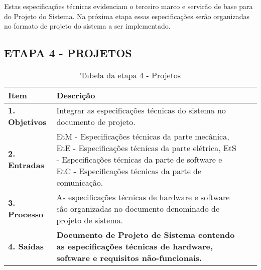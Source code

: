  Estas especificações técnicas evidenciam o terceiro marco e servirão de base para do Projeto do Sistema. Na próxima etapa essas especificações serão organizadas no formato de projeto do sistema a ser implementado. 
 
 
  
 \newpage
\subsection{ETAPA 4 - PROJETOS}

\begin{description}

\begin{table}[htbp]
	\centering
	\caption{Tabela da etapa 4 - Projetos}
	\begin{tabular}{|l| p{13.5cm}| c| c| } \hline
		\textbf{Item} 	    & \textbf{Descrição} 
		\\ \hline
		\textbf{1. Objetivos}	   &  
		Integrar as especificações técnicas do sistema no documento de projeto.
		
		\\ \hline
		\textbf{2. Entradas}	  &		
		EtM - Especificações técnicas da parte mecânica, EtE - Especificações técnicas da parte elétrica, EtS - Especificações técnicas da parte de software e EtC - Especificações técnicas da parte de comunicação. \par  	
		
		\\ \hline	
		\textbf{3. Processo}     &
		As especificações técnicas de hardware e software são organizadas no documento denominado de projeto de sistema.
		
		\\ \hline
		\textbf{4. Saídas}		& 
		\textbf{Documento de Projeto de Sistema contendo as especificações técnicas de hardware, software e requisitos não-funcionais.}  
		

\end{tabular}
\end{table}
\end{description}
